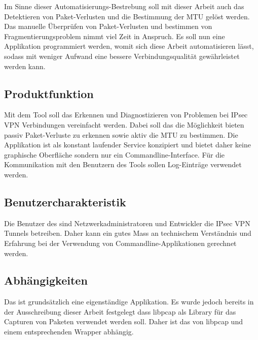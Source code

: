 Im Sinne dieser Automatisierungs-Bestrebung soll mit dieser Arbeit auch das Detektieren von Paket-Verlusten und die Bestimmung der MTU gelöst werden.
Das manuelle Überprüfen von Paket-Verlusten und bestimmen von Fragmentierungsproblem nimmt viel Zeit in Anspruch. Es soll nun eine Applikation programmiert werden, womit sich diese Arbeit automatisieren lässt, sodass mit weniger Aufwand eine bessere Verbindungsqualität gewährleistet werden kann.


\subsection{Produktfunktion}
Mit dem Tool soll das Erkennen und Diagnostizieren von Problemen bei \acs{IPsec} \acs{VPN} Verbindungen vereinfacht werden. Dabei soll das \tool{} die Möglichkeit bieten passiv Paket-Verluste zu erkennen sowie aktiv die \acs{MTU} zu bestimmen. Die Applikation ist als konstant laufender Service konzipiert und bietet daher keine graphische Oberfläche sondern nur ein Commandline-Interface. Für die Kommunikation mit den Benutzern des Tools sollen Log-Einträge verwendet werden.

\subsection{Benutzercharakteristik}
Die Benutzer des \tool{} sind Netzwerkadministratoren und Entwickler die \acs{IPsec} \acs{VPN} Tunnels betreiben. Daher kann ein gutes Mass an technischem Verständnis und Erfahrung bei der Verwendung von Commandline-Applikationen gerechnet werden.

\subsection{Abhängigkeiten}
Das \tool{} ist grundsätzlich eine eigenständige Applikation. Es wurde jedoch bereits in der Ausschreibung dieser Arbeit festgelegt dass libpcap als Library für das Capturen von Paketen verwendet werden soll. Daher ist das \tool{} von libpcap und einem entsprechenden Wrapper abhängig.